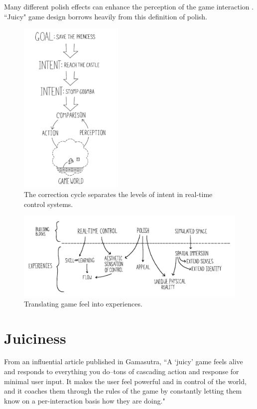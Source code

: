 Many different polish effects can enhance the perception of the game interaction \cite{swink2009game}. ``Juicy" game design borrows heavily from this definition of polish.

\begin{figure}
\centering
\includegraphics[width=50mm]{images/correction.pdf}
\caption[The correction cycle of real-time control systems.]{The correction cycle separates the levels of intent in real-time control systems.}
\label{fig:correction}
\end{figure}

\begin{figure}
\centering
\includegraphics[width=150mm]{images/blocks.pdf}
\caption[The building blocks of experiences in video games.]{Translating game feel into experiences.}
\label{fig:blocks}
\end{figure}

\section{Juiciness}

From an influential article published in Gamasutra, ``A `juicy' game feels alive and responds to everything you do--tons of cascading action and response for minimal user input. It makes the user feel powerful and in control of the world, and it coaches them through the rules of the game by constantly letting them know on a per-interaction basis how they are doing." \cite{gamasutra}

